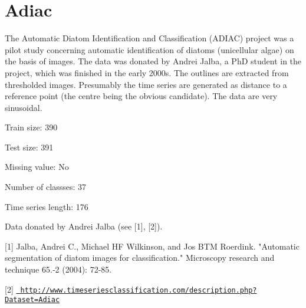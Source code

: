 \chapter{Adiac}
\hypertarget{md_external_2data_2UCRArchive__2018_2Adiac_2README}{}\label{md_external_2data_2UCRArchive__2018_2Adiac_2README}
\label{md_external_2data_2UCRArchive__2018_2Adiac_2README_autotoc_md1}%
%
 The Automatic Diatom Identification and Classification (ADIAC) project was a pilot study concerning automatic identification of diatoms (unicellular algae) on the basis of images. The data was donated by Andrei Jalba, a PhD student in the project, which was finished in the early 2000s. The outlines are extracted from thresholded images. Presumably the time series are generated as distance to a reference point (the centre being the obvious candidate). The data are very sinusoidal.

Train size\+: 390

Test size\+: 391

Missing value\+: No

Number of classses\+: 37

Time series length\+: 176

Data donated by Andrei Jalba (see \mbox{[}1\mbox{]}, \mbox{[}2\mbox{]}).

\mbox{[}1\mbox{]} Jalba, Andrei C., Michael HF Wilkinson, and Jos BTM Roerdink. "{}\+Automatic segmentation of diatom images for classification."{} Microscopy research and technique 65.‐2 (2004)\+: 72-\/85.

\mbox{[}2\mbox{]} \href{http://www.timeseriesclassification.com/description.php?Dataset=Adiac}{\texttt{ http\+://www.\+timeseriesclassification.\+com/description.\+php?\+Dataset=\+Adiac}} 